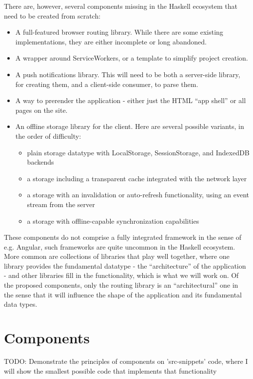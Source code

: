 \documentclass[english,odsaz]{fitthesis}
\begin{document}
There are, however, several components missing in the Haskell ecosystem that
need to be created from scratch:
\begin{itemize}
\item A full-featured browser routing library. While there are some existing
implementations, they are either incomplete or long abandoned.
\item A wrapper around ServiceWorkers, or a template to simplify project creation.
\item A push notifications library. This will need to be both a server-side library,
for creating them, and a client-side consumer, to parse them.
\item A way to prerender the application - either just the HTML ``app shell'' or all
pages on the site.
\item An offline storage library for the client. Here are several possible variants,
in the order of difficulty:
\begin{itemize}
\item plain storage datatype with LocalStorage, SessionStorage, and IndexedDB backends
\item a storage including a transparent cache integrated with the network layer
\item a storage with an invalidation or auto-refresh functionality, using an event
stream from the server
\item a storage with offline-capable synchronization capabilities
\end{itemize}
\end{itemize}

These components do not comprise a fully integrated framework in the sense of
e.g. Angular, such frameworks are quite uncommon in the Haskell ecosystem. More
common are collections of libraries that play well together, where one library
provides the fundamental datatype - the ``architecture'' of the application - and
other libraries fill in the functionality, which is what we will work on. Of the
proposed components, only the routing library is an ``architectural'' one in the
sense that it will influence the shape of the application and its fundamental
data types.

\chapter{Components}
\label{sec:org6023460}
TODO: Demonstrate the principles of components on 'src-snippets' code, where
I will show the smallest possible code that implements that functionality
\end{document}

